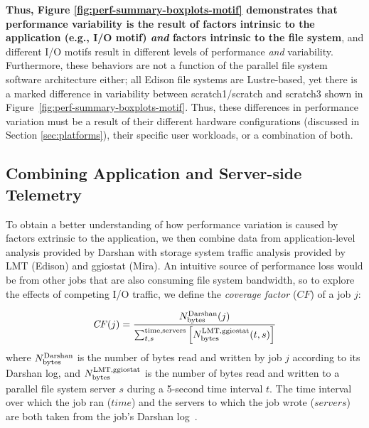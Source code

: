 \textbf{Thus, Figure \ref{fig:perf-summary-boxplots-motif} demonstrates that 
performance variability is the result of factors intrinsic to the application (e.g., I/O motif) \emph{and} factors intrinsic to the file system}, and
different I/O motifs result in different levels of performance \emph{and} variability.
Furthermore, these behaviors are not a function of the parallel file system software architecture either; all Edison file systems are Lustre-based, yet there is a marked difference in variability between scratch1/scratch and scratch3 shown in Figure~\ref{fig:perf-summary-boxplots-motif}.
Thus, these differences in performance variation must be a result of their different hardware configurations (discussed in Section \ref{sec:platforms}), their specific user workloads, or a combination of both.

\subsection{Combining Application and Server-side Telemetry} \label{sec:results/combining}

To obtain a better understanding of how performance variation is caused by factors extrinsic to the application, we then combine data from application-level analysis provided by Darshan with storage system traffic analysis provided by LMT (Edison) and ggiostat (Mira).
An intuitive source of performance loss would be from other jobs that are also consuming file system bandwidth, so to explore the effects of competing I/O traffic, we define the \emph{coverage factor} ($\mathit{CF}$) of a job $j$:

\begin{equation} \label{eq:cf}
    \mathit{CF}(j) = \frac{N_{\textup{bytes}}^{\textup{Darshan}}(j)}
    {\sum_{t,s}^{\textup{time,servers}}
    \left [ N_{\textup{bytes}}^{\textup{LMT,ggiostat}}(t,s) \right ] }
\end{equation}
%
where $N_{\textup{bytes}}^{\textup{Darshan}}$ is the number of bytes read and written by job $j$ according to its Darshan log, and $N_{\textup{bytes}}^{\textup{LMT,ggiostat}}$ is the number of bytes read and written to a parallel file system server $s$ during a 5-second time interval $t$.
The time interval over which the job ran ($\mathit{time}$) and the servers to which the job wrote ($\mathit{servers}$) are both taken from the job's Darshan log~\cite{snyder2016modular}.

